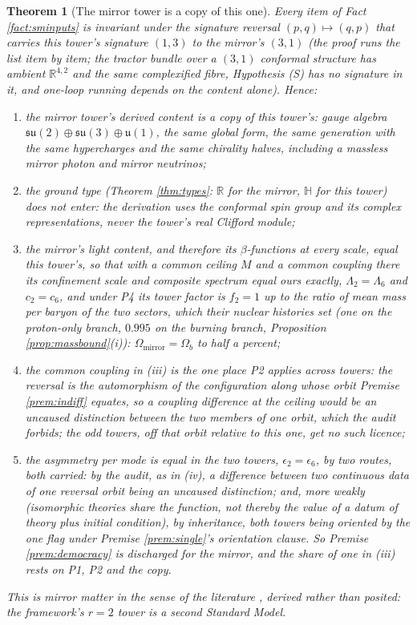 \documentclass[11pt]{article}
\newtheorem{theorem}{Theorem}[section]
\theoremstyle{definition}
\newcommand{\R}{\mathbb{R}}
\begin{document}
\begin{theorem}[The mirror tower is a copy of this one]\label{thm:mirror}
Every item of Fact \ref{fact:sminputs} is invariant under the signature reversal $(p,q) \mapsto (q,p)$ that carries this tower's signature $(1,3)$ to the mirror's $(3,1)$ (the proof runs the list item by item; the tractor bundle over a $(3,1)$ conformal structure has ambient $\R^{4,2}$ and the same complexified fibre, Hypothesis (S) has no signature in it, and one-loop running depends on the content alone). Hence:
\begin{enumerate}
\item[(i)] the mirror tower's derived content is a copy of this tower's: gauge algebra $\mathfrak{su}(2) \oplus \mathfrak{su}(3) \oplus \mathfrak{u}(1)$, the same global form, the same generation with the same hypercharges and the same chirality halves, including a massless mirror photon and mirror neutrinos;
\item[(ii)] the ground type (Theorem \ref{thm:types}: $\R$ for the mirror, $\mathbb{H}$ for this tower) does not enter: the derivation uses the conformal spin group and its complex representations, never the tower's real Clifford module;
\item[(iii)] the mirror's light content, and therefore its $\beta$-functions at every scale, equal this tower's, so that with a common ceiling $M$ and a common coupling there its confinement scale and composite spectrum equal ours exactly, $\Lambda_{2} = \Lambda_{6}$ and $c_{2} = c_{6}$, and under P4 its tower factor is $f_{2} = 1$ up to the ratio of mean mass per baryon of the two sectors, which their nuclear histories set (one on the proton-only branch, $0.995$ on the burning branch, Proposition \ref{prop:massbound}(i)): $\Omega_{\mathrm{mirror}} = \Omega_{b}$ to half a percent;
\item[(iv)] the common coupling in (iii) is the one place P2 applies across towers: the reversal is the automorphism of the configuration along whose orbit Premise \ref{prem:indiff} equates, so a coupling difference at the ceiling would be an uncaused distinction between the two members of one orbit, which the audit forbids; the odd towers, off that orbit relative to this one, get no such licence;
\item[(v)] the asymmetry per mode is equal in the two towers, $\epsilon_{2} = \epsilon_{6}$, by two routes, both carried: by the audit, as in (iv), a difference between two continuous data of one reversal orbit being an uncaused distinction; and, more weakly (isomorphic theories share the function, not thereby the value of a datum of theory plus initial condition), by inheritance, both towers being oriented by the one flag under Premise \ref{prem:single}'s orientation clause. So Premise \ref{prem:democracy} is discharged for the mirror, and the share of one in (iii) rests on P1, P2 and the copy.
\end{enumerate}
This is mirror matter in the sense of the literature \cite{FootMirror2004}, derived rather than posited: the framework's $r = 2$ tower is a second Standard Model.
\end{theorem}
\end{document}
